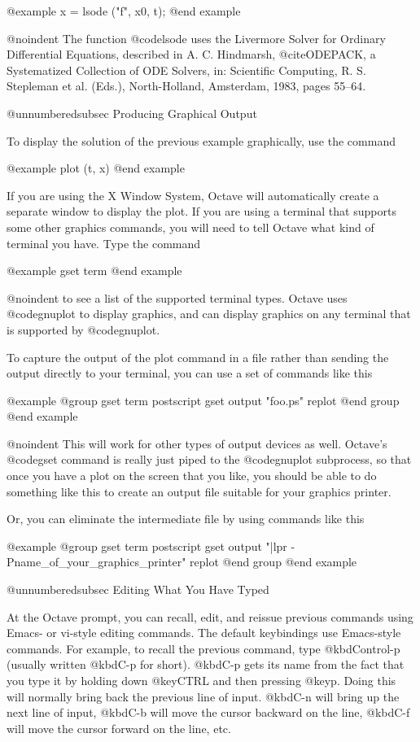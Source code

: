 {@example
x = lsode ("f", x0, t);
@end example

@noindent
The function @code{lsode} uses the Livermore Solver for Ordinary
Differential Equations, described in A. C. Hindmarsh, @cite{ODEPACK, a
Systematized Collection of ODE Solvers}, in: Scientific Computing, R. S.
Stepleman et al. (Eds.), North-Holland, Amsterdam, 1983, pages 55--64.

@unnumberedsubsec Producing Graphical Output

To display the solution of the previous example graphically, use the
command

@example
plot (t, x)
@end example

If you are using the X Window System, Octave will automatically create
a separate window to display the plot.  If you are using a terminal that
supports some other graphics commands, you will need to tell Octave what
kind of terminal you have.  Type the command

@example
gset term
@end example

@noindent
to see a list of the supported terminal types.  Octave uses
@code{gnuplot} to display graphics, and can display graphics on any
terminal that is supported by @code{gnuplot}.

To capture the output of the plot command in a file rather than sending
the output directly to your terminal, you can use a set of commands like
this

@example
@group
gset term postscript
gset output "foo.ps"
replot
@end group
@end example

@noindent
This will work for other types of output devices as well.  Octave's
@code{gset} command is really just piped to the @code{gnuplot}
subprocess, so that once you have a plot on the screen that you like,
you should be able to do something like this to create an output file
suitable for your graphics printer.

Or, you can eliminate the intermediate file by using commands like this

@example
@group
gset term postscript
gset output "|lpr -Pname_of_your_graphics_printer"
replot
@end group
@end example

@unnumberedsubsec Editing What You Have Typed

At the Octave prompt, you can recall, edit, and reissue previous
commands using Emacs- or vi-style editing commands.  The default
keybindings use Emacs-style commands.  For example, to recall the
previous command, type @kbd{Control-p} (usually written @kbd{C-p} for
short).  @kbd{C-p} gets its name from the fact that you type it by
holding down @key{CTRL} and then pressing @key{p}.  Doing this will
normally bring back the previous line of input.  @kbd{C-n} will bring up
the next line of input, @kbd{C-b} will move the cursor backward on the
line, @kbd{C-f} will move the cursor forward on the line, etc.

}
